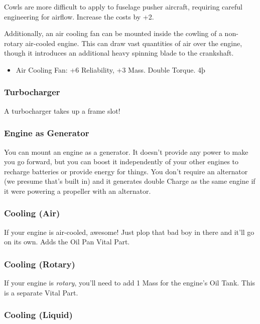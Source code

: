 \documentclass{article}
\begin{document}
Cowls are more difficult to apply to fuselage pusher aircraft,
requiring careful engineering for airflow. Increase the costs by +2.

Additionally, an air cooling fan can be mounted inside the
cowling of a non-rotary air-cooled engine. This can draw vast quantities
of air over the engine, though it introduces an additional heavy
spinning blade to the crankshaft.

\begin{itemize}
  \item          Air Cooling Fan: +6 Reliability, +3 Mass. Double Torque. 4þ
\end{itemize}

\subsubsection{Turbocharger}
\label{_Turbocharger}

A turbocharger takes up a frame slot!

\subsubsection{Engine as Generator}
\label{Engine_as_Generator}

You can mount an engine as a generator. It doesn't provide any power to
make you go forward, but you can boost it independently of your other
engines to recharge batteries or provide energy for things. You don't
require an alternator (we presume that's built in) and it generates
double Charge as the same engine if it were powering a propeller with an
alternator.

\subsubsection{Cooling (Air)}
\label{_Cooling_(Air)}

If your engine is air-cooled, awesome! Just plop that bad boy in there
and it'll go on its own. Adds the Oil Pan Vital Part.

\subsubsection{Cooling (Rotary)}
\label{_Cooling_(Rotary)}

If your engine is \emph{rotary}, you'll need to add 1 Mass for the
engine's Oil Tank. This is a separate Vital Part.

\subsubsection{Cooling (Liquid)}
\label{_Cooling_(Liquid)}
\end{document}
